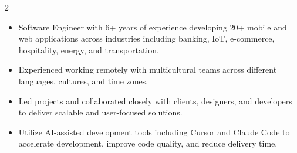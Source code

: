 \documentclass[10pt,a4paper,ragged2e,withhyper]{altacv}
\begin{document}


    \makecvheader


    \begin{paracol}{2}




        \newpage

        \switchcolumn

            \begin{itemize}
                \item Software Engineer with 6+ years of experience developing 20+ mobile and web applications across industries including banking, IoT, e-commerce, hospitality, energy, and transportation.
                \item Experienced working remotely with multicultural teams across different languages, cultures, and time zones.
                \item Led projects and collaborated closely with clients, designers, and developers to deliver scalable and user-focused solutions.
                \item Utilize AI-assisted development tools including Cursor and Claude Code to accelerate development, improve code quality, and reduce delivery time.
            \divider
            \end{itemize}


\end{paracol}
\end{document}
